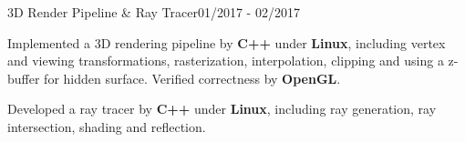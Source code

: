 \begin{rSubsection}{3D Render Pipeline \& Ray Tracer}{01/2017 - 02/2017}{}{} 
\item Implemented a 3D rendering pipeline by {\bf C++} under {\bf Linux}, including vertex and viewing transformations, rasterization, interpolation, clipping and using a z-buffer for hidden surface. Verified correctness by {\bf OpenGL}. 
\item Developed a ray tracer by {\bf C++} under {\bf Linux}, including ray generation, ray intersection, shading and reflection.
\end{rSubsection} 